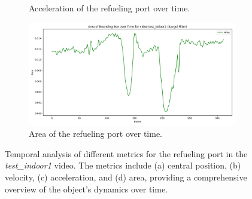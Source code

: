 \documentclass[12pt,oneside]{book} %
\begin{document}
\begin{figure}[H]
\begin{subfigure}[t]{0.6\textwidth}
        \caption{Acceleration of the refueling port over time.}
        \label{fig:acceleration-test-indoor1-savgol}
    \end{subfigure}
    \hfill
    \begin{subfigure}[t]{0.6\textwidth}
        \includegraphics[width=\textwidth]{figures/bbox_metrics/test_indoor1 (Savgol Filter)_area.png}
        \caption{Area of the refueling port over time.}
        \label{fig:size-test-indoor1-savgol}
    \end{subfigure}
    \caption{Temporal analysis of different metrics for the refueling port in the \textit{test\_indoor1} video. The metrics include (a) central position, (b) velocity, (c) acceleration, and (d) area, providing a comprehensive overview of the object's dynamics over time.}
    \label{fig:bbox-metrics-test-indoor1-savgol}
\end{figure}
\end{document}
